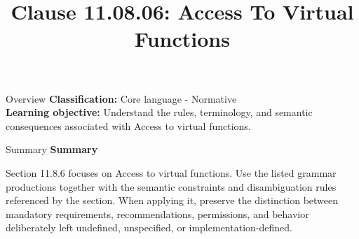 \documentclass[10pt,letterpaper]{article}
\title{Clause 11.08.06: Access To Virtual Functions}
\author{}
\date{}
\begin{document}
\maketitle
\begin{CornellOverviewBox}{Overview}
\textbf{Classification:} Core language - Normative\\[2pt]
\textbf{Learning objective:} Understand the rules, terminology, and semantic consequences associated with Access to virtual functions.
\end{CornellOverviewBox}\begin{CornellSummaryBox}{Summary}
{\sffamily\bfseries\color{Accent} Summary}\par\vspace{3pt}Section 11.8.6 focuses on Access to virtual functions. Use the listed grammar productions together with the semantic constraints and disambiguation rules referenced by the section. When applying it, preserve the distinction between mandatory requirements, recommendations, permissions, and behavior deliberately left undefined, unspecified, or implementation-defined.
\end{CornellSummaryBox}
\end{document}
